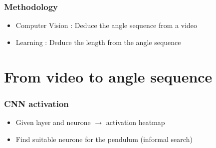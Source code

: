 \documentclass{beamer}
\begin{document}
\begin{frame}
\frametitle{Methodology}
\begin{itemize}
  \item Computer Vision : Deduce the angle sequence from a video
  \item Learning : Deduce the length from the angle sequence
\end{itemize}
\end{frame}

\section{From video to angle sequence}

\begin{frame}
\frametitle{CNN activation}
\begin{itemize}
	\item Given layer and neurone $\rightarrow$ activation heatmap
	\item Find suitable neurone for the pendulum (informal search)
\end{itemize}
\end{frame}
\end{document}
